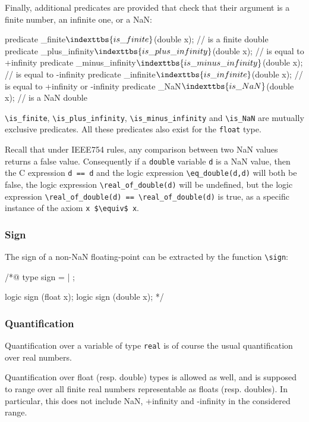 Finally, additional predicates are provided that check that their argument
is a finite number, an infinite one, or a NaN:
\begin{listing}{1}
predicate \is_finite$\indexttbs{is\_finite}$(double x); // is a finite double
predicate \is_plus_infinity$\indexttbs{is\_plus\_infinity}$(double x); // is equal to +infinity
predicate \is_minus_infinity$\indexttbs{is\_minus\_infinity}$(double x); // is equal to -infinity
predicate \is_infinite$\indexttbs{is\_infinite}$(double x); // is equal to +infinity or -infinity
predicate \is_NaN$\indexttbs{is\_NaN}$(double x); // is a NaN double
\end{listing}
\lstinline|\is_finite|, \lstinline|\is_plus_infinity|,
\lstinline|\is_minus_infinity| and \lstinline|\is_NaN| are mutually
exclusive predicates.
All these predicates also exist for the \lstinline|float| type.

Recall that under IEEE754 rules, any comparison between two NaN values returns a false value.
Consequently if a \lstinline|double| variable \lstinline|d| is a
NaN value, then the C expression \lstinline|d == d| and the logic expression \lstinline|\eq_double(d,d)| will both be
false, the logic expression \lstinline|\real_of_double(d)| will be undefined,
but the logic expression
\lstinline|\real_of_double(d) == \real_of_double(d)| is true, as a specific instance of the axiom \lstinline|x $\equiv$ x|.
\subsubsection{Sign}

The sign of a non-NaN floating-point  can be extracted by
the function \lstinline|\sign|:
\begin{listing}{1}
/*@
 type sign = \Positive | \Negative;

 logic sign \sign(float x);
 logic sign \sign(double x);
*/
\end{listing}


\subsubsection{Quantification}

Quantification over a variable of type \lstinline|real| is of course the usual
quantification over real numbers.

Quantification over float (resp. double) types is allowed as well, and is
supposed to range over all finite real numbers representable as floats (resp.
doubles). In particular, this does not include NaN, +infinity and
-infinity in the considered range.


